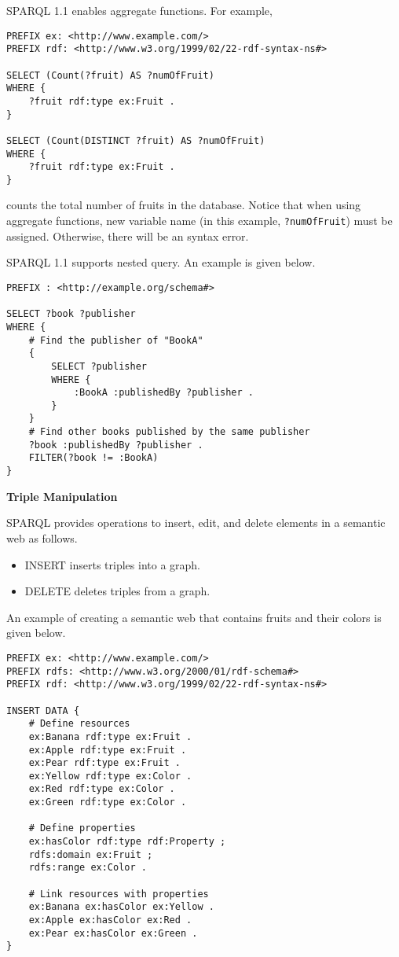 SPARQL 1.1 enables aggregate functions. For example,
\begin{lstlisting}
PREFIX ex: <http://www.example.com/>
PREFIX rdf: <http://www.w3.org/1999/02/22-rdf-syntax-ns#>

SELECT (Count(?fruit) AS ?numOfFruit)
WHERE {
	?fruit rdf:type ex:Fruit .
}

SELECT (Count(DISTINCT ?fruit) AS ?numOfFruit)
WHERE {
	?fruit rdf:type ex:Fruit .
}
\end{lstlisting}
counts the total number of fruits in the database. Notice that when using aggregate functions, new variable name (in this example, \verb|?numOfFruit|) must be assigned. Otherwise, there will be an syntax error.

SPARQL 1.1 supports nested query. An example is given below.
\begin{lstlisting}
PREFIX : <http://example.org/schema#>

SELECT ?book ?publisher
WHERE {
	# Find the publisher of "BookA"
	{
		SELECT ?publisher
		WHERE {
			:BookA :publishedBy ?publisher .
		}
	}
	# Find other books published by the same publisher
	?book :publishedBy ?publisher .
	FILTER(?book != :BookA)
}
\end{lstlisting}

\vspace{0.1in}
\noindent \textbf{Triple Manipulation}
\vspace{0.1in}

SPARQL provides operations to insert, edit, and delete elements in a semantic web as follows.
\begin{itemize}
	\item INSERT inserts triples into a graph.
	\item DELETE deletes triples from a graph.
\end{itemize}

An example of creating a semantic web that contains fruits and their colors is given below.
\begin{lstlisting}
PREFIX ex: <http://www.example.com/>
PREFIX rdfs: <http://www.w3.org/2000/01/rdf-schema#>
PREFIX rdf: <http://www.w3.org/1999/02/22-rdf-syntax-ns#>

INSERT DATA {
	# Define resources
	ex:Banana rdf:type ex:Fruit .
	ex:Apple rdf:type ex:Fruit .
	ex:Pear rdf:type ex:Fruit .
	ex:Yellow rdf:type ex:Color .
	ex:Red rdf:type ex:Color .
	ex:Green rdf:type ex:Color .
	
	# Define properties
	ex:hasColor rdf:type rdf:Property ;
	rdfs:domain ex:Fruit ;
	rdfs:range ex:Color .
	
	# Link resources with properties
	ex:Banana ex:hasColor ex:Yellow .
	ex:Apple ex:hasColor ex:Red .
	ex:Pear ex:hasColor ex:Green .
}
\end{lstlisting}

